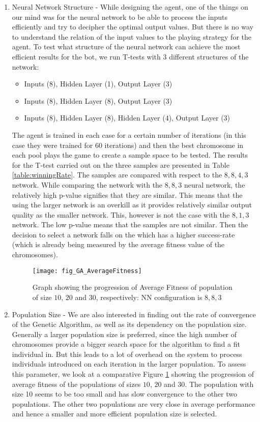 \begin{enumerate}
\item Neural Network Structure - While designing the agent, one of the things on our mind was for the neural network to be able to process the inputs efficiently and try to decipher the optimal output values. But there is no way to understand the relation of the input values to the playing strategy for the agent. To test what structure of the neural network can achieve the most efficient results for the bot, we run T-tests with $3$ different structures of the network:
\begin{itemize}
\item Inputs (8), Hidden Layer (1), Output Layer (3)
\item Inputs (8), Hidden Layer (8), Output Layer (3)
\item Inputs (8), Hidden Layer (8), Hidden Layer (4), Output Layer (3)
\end{itemize}
The agent is trained in each case for a certain number of iterations (in this case they were trained for $60$ iterations) and then the best chromosome in each pool plays the game to create a sample space to be tested. The results for the T-test carried out on the three samples are presented in Table \ref{table:winningRate}. The samples are compared with respect to the $8,8,4,3$ network. While comparing the network with the $8,8,3$ neural network, the relatively high p-value signifies that they are similar. This means that the using the larger network is an overkill as it provides relatively similar output quality as the smaller network. This, however is not the case with the $8,1,3$ network. The low p-value means that the samples are not similar. Then the decision to select a network falls on the which has a higher success-rate (which is already being measured by the average fitness value of the chromosomes).
\begin{figure}[htp]
\centerline{\texttt{[image: fig\_GA\_AverageFitness]}}
\caption{Graph showing the progression of Average Fitness of population of size $10$, $20$ and $30$, respectively: NN configuration is $8,8,3$}
\label{fig:AverageFitness}
\end{figure}
\item Population Size - We are also interested in finding out the rate of convergence of the Genetic Algorithm, as well as its dependency on the population size. Generally a larger population size is preferred, since the high number of chromosomes provide a bigger search space for the algorithm to find a fit individual in. But this leads to a lot of overhead on the system to process individuals introduced on each iteration in the larger population. To assess this parameter, we look at a comparative Figure \ref{fig:AverageFitness} showing the progression of average fitness of the populations of sizes $10$, $20$ and $30$. The population with size 10 seems to be too small and has slow convergence to the other two populations. The other two populations are very close in average performance and hence a smaller and more efficient population size is selected. 

\end{enumerate}
